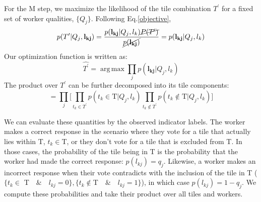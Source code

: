 \documentclass[12pt]{article}
\DeclareMathOperator*{\argmax}{arg\,max}
\begin{document}
For the M step, we maximize the likelihood of the tile combination $T^\prime$ for a fixed set of worker qualities, $\{Q_j\}$. Following Eq.\ref{objective}, 
\begin{equation}
p(T^\prime| Q_j,\mathbf{l_{kj}})
=\frac{p(\mathbf{l_{kj}}|Q_j,l_k)\cancel{P(T^\prime)}}{\cancel{p(\mathbf{l_{kj}})}}=p(\mathbf{l_{kj}}|Q_j,l_k)
\end{equation}
Our optimization function is written as:
\begin{equation}
\hat{T^\prime}=\argmax \prod_j p(\mathbf{l_{kj}}|Q_j,l_k)
\end{equation}
The product over $T^\prime$ can be further decomposed into its tile components: 
\begin{equation}
=\prod_j\Bigg[\prod_{t_k\in T^\prime} p(t_k\in \mathrm{T}|Q_j,l_k)\prod_{t_k\notin T^\prime} p(t_k\notin \mathrm{T}|Q_j,l_k)\Bigg]
\end{equation}
\par We can evaluate these quantities by the observed indicator labels. The worker makes a correct response in the scenario where they vote for a tile that actually lies within T, $t_k\in $T, or they don't vote for a tile that is excluded from T. In those cases, the probability of the tile being in T is the probability that the worker had made the correct response: $p(l_{kj}) = q_j$. Likewise, a worker makes an incorrect response when their vote contradicts with the inclusion of the tile in T ($\{t_k\in$ T$\quad\&\quad l_{kj}=0\}, \{t_k\notin $T$\quad\&\quad l_{kj}=1\}$), in which case $p(l_{kj})=1-q_j$. We compute these probabilities and take their product over all tiles and workers.
\end{document}
